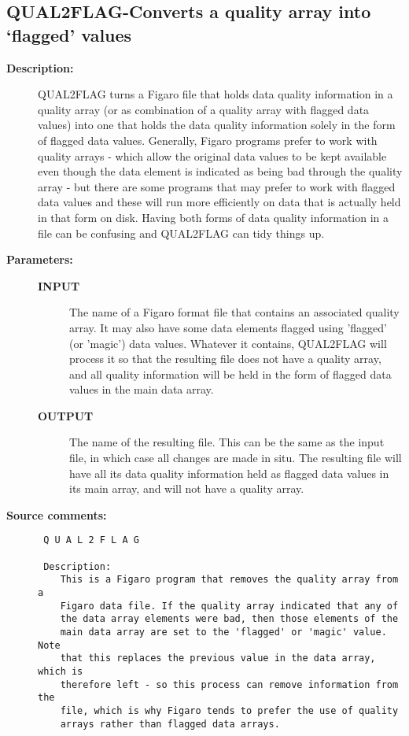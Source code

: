 \subsection{QUAL2FLAG-\label{QUAL2FLAG}Converts a quality array into `flagged' values}
\begin{description}

\item [{\bf Description:}]
 QUAL2FLAG turns a Figaro file that holds data quality information in
 a quality array (or as combination of a quality array with flagged
 data values) into one that holds the data quality information solely
 in the form of flagged data values. Generally, Figaro programs
 prefer to work with quality arrays - which allow the original data
 values to be kept available even though the data element is
 indicated as being bad through the quality array - but there are
 some programs that may prefer to work with flagged data values and
 these will run more efficiently on data that is actually held in
 that form on disk. Having both forms of data quality information
 in a file can be confusing and QUAL2FLAG can tidy things up.

\item [{\bf Parameters:}]
\begin{description}
\item [{\bf INPUT}]
 The name of a Figaro format file that
 contains an associated quality array. It may also have
 some data elements flagged using 'flagged' (or 'magic')
 data values. Whatever it contains, QUAL2FLAG will process it
 so that the resulting file does not have a quality array,
 and all quality information will be held in the form of
 flagged data values in the main data array.
\item [{\bf OUTPUT}]
 The name of the resulting file. This can
 be the same as the input file, in which case all changes are
 made in situ. The resulting file will have all its data
 quality information held as flagged data values in its
 main array, and will not have a quality array.
\end{description}

\item [{\bf Source comments:}]
\begin{verbatim}
 Q U A L 2 F L A G

 Description:
    This is a Figaro program that removes the quality array from a
    Figaro data file. If the quality array indicated that any of
    the data array elements were bad, then those elements of the
    main data array are set to the 'flagged' or 'magic' value. Note
    that this replaces the previous value in the data array, which is
    therefore left - so this process can remove information from the
    file, which is why Figaro tends to prefer the use of quality
    arrays rather than flagged data arrays.


\end{verbatim}
\end{description}
